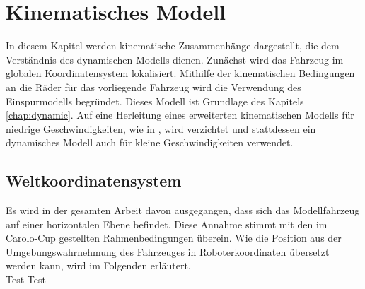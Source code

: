 \chapter{Kinematisches Modell} \label{chap:kinematik}
In diesem Kapitel werden kinematische Zusammenhänge dargestellt, die dem Verständnis des dynamischen Modells dienen. Zunächst wird das Fahrzeug im globalen Koordinatensystem lokalisiert. Mithilfe der kinematischen Bedingungen an die Räder für das vorliegende Fahrzeug wird die Verwendung des Einspurmodells begründet. Dieses Modell ist Grundlage des Kapitels \ref{chap:dynamic}. Auf eine Herleitung eines erweiterten kinematischen Modells für niedrige Geschwindigkeiten, wie in \cite{Werling2010}, wird verzichtet und stattdessen ein dynamisches Modell auch für kleine Geschwindigkeiten verwendet.

\section{Weltkoordinatensystem} \label{sec:Weltkoord}
Es wird in der gesamten Arbeit davon ausgegangen, dass sich das Modellfahrzeug auf einer horizontalen Ebene befindet.
Diese Annahme stimmt mit den im Carolo-Cup gestellten Rahmenbedingungen überein. 
Wie die Position aus der Umgebungswahrnehmung des Fahrzeuges in Roboterkoordinaten übersetzt werden kann, wird im Folgenden erläutert.
\\
Test Test
